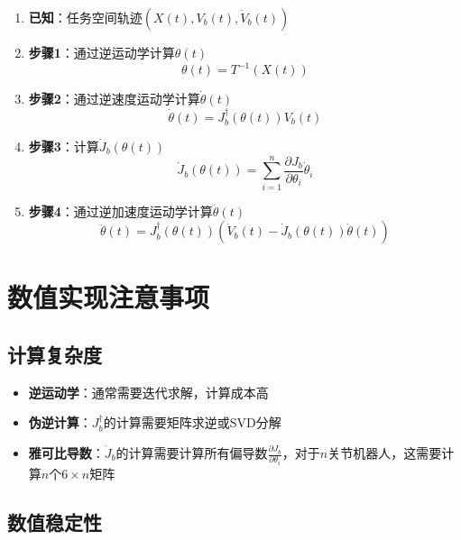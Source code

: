 \documentclass{article}
\begin{document}
\begin{enumerate}
\item \textbf{已知}：任务空间轨迹$(X(t), V_b(t), \dot{V}_b(t))$

\item \textbf{步骤1}：通过逆运动学计算$\theta(t)$
\begin{equation}
\theta(t) = T^{-1}(X(t))
\end{equation}

\item \textbf{步骤2}：通过逆速度运动学计算$\dot{\theta}(t)$
\begin{equation}
\dot{\theta}(t) = J_b^{\dagger}(\theta(t))V_b(t)
\end{equation}

\item \textbf{步骤3}：计算$\dot{J}_b(\theta(t))$
\begin{equation}
\dot{J}_b(\theta(t)) = \sum_{i=1}^{n}\frac{\partial J_b}{\partial \theta_i}\dot{\theta}_i
\end{equation}

\item \textbf{步骤4}：通过逆加速度运动学计算$\ddot{\theta}(t)$
\begin{equation}
\ddot{\theta}(t) = J_b^{\dagger}(\theta(t))\left(\dot{V}_b(t) - \dot{J}_b(\theta(t))\dot{\theta}(t)\right)
\end{equation}
\end{enumerate}

\section{数值实现注意事项}

\subsection{计算复杂度}

\begin{itemize}
\item \textbf{逆运动学}：通常需要迭代求解，计算成本高
\item \textbf{伪逆计算}：$J_b^{\dagger}$的计算需要矩阵求逆或SVD分解
\item \textbf{雅可比导数}：$\dot{J}_b$的计算需要计算所有偏导数$\frac{\partial J_b}{\partial \theta_i}$，对于$n$关节机器人，这需要计算$n$个$6 \times n$矩阵
\end{itemize}

\subsection{数值稳定性}
\end{document}
